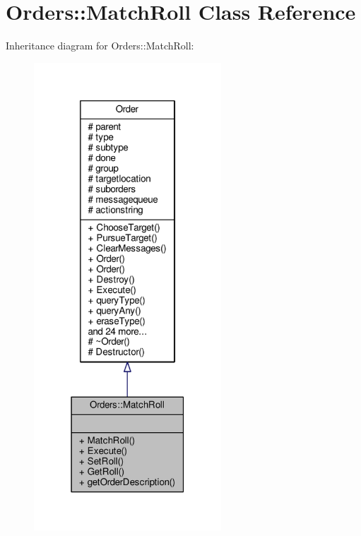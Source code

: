 \hypertarget{classOrders_1_1MatchRoll}{}\section{Orders\+:\+:Match\+Roll Class Reference}
\label{classOrders_1_1MatchRoll}


Inheritance diagram for Orders\+:\+:Match\+Roll\+:
\nopagebreak
\begin{figure}[H]
\begin{center}
\leavevmode
\includegraphics[width=199pt]{dd/d32/classOrders_1_1MatchRoll__inherit__graph}
\end{center}
\end{figure}


